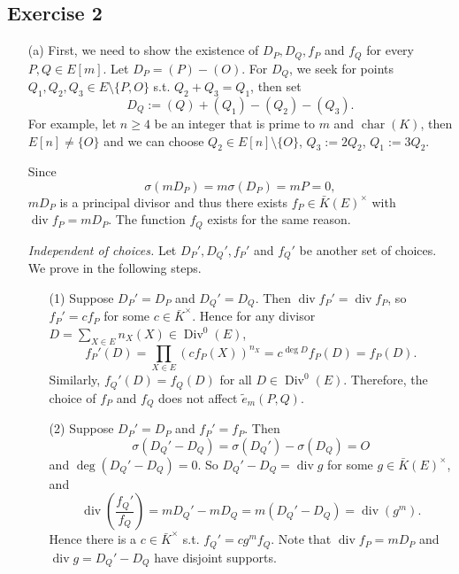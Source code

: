\documentclass{article}
\theoremstyle{definition}
\theoremstyle{remark}
\DeclareMathOperator{\cha}{char} %
\renewcommand{\div}{\mathop{\mathrm{div}}}
\DeclareMathOperator{\Div}{Div}
\begin{document}
\subsection*{Exercise 2}
\begin{enumerate}
\item [(a)]
First, we need to show the existence of $D_P, D_Q, f_P$ and $f_Q$ for every $P, Q\in E[m]$.
Let $D_P = (P) - (O)$.
For $D_Q$, we seek for points $Q_1, Q_2, Q_3\in E\setminus\{P, O\}$ s.t. $Q_2+Q_3 = Q_1$, then set \[D_Q := (Q) + (Q_1) - (Q_2) - (Q_3).\] For example, let $n\ge 4$ be an integer that is prime to $m$ and $\cha(K)$, then $E[n]\ne \{O\}$ and we can choose $Q_2\in E[n]\setminus\{O\}$, $Q_3 := 2Q_2$, $Q_1 := 3Q_2$.

Since \[\sigma(mD_P) = m\sigma(D_P) = mP = 0,\]
$mD_P$ is a principal divisor and thus there exists $f_P\in\bar{K}(E)^\times$ with $\div f_P = mD_P$.
The function $f_Q$ exists for the same reason.

\textit{Independent of choices.}
Let $D_P', D_Q', f_P'$ and $f_Q'$ be another set of choices.
We prove in the following steps.
\begin{enumerate}
    \item [(1)] Suppose $D_P' = D_P$ and $D_Q' = D_Q$. Then $\div f_P' = \div f_P$, so $f_P' = cf_P$ for some $c\in \bar{K}^\times$. Hence for any divisor $D = \sum_{X\in E} n_X(X)\in\Div^0(E)$, \[f_P'(D) = \prod_{X\in E} (cf_P(X))^{n_X} = c^{\deg D}f_P(D) = f_P(D).\]
    Similarly, $f_Q'(D) = f_Q(D)$ for all $D\in\Div^0(E)$. Therefore, the choice of $f_P$ and $f_Q$ does not affect $\tilde{e}_m(P, Q)$.

    \item [(2)] Suppose $D_P' = D_P$ and $f_P' = f_P$. Then \[\sigma(D_Q'-D_Q) = \sigma(D_Q') - \sigma(D_Q) = O\]
    and $\deg(D_Q'-D_Q) = 0$. So $D_Q' - D_Q = \div g$ for some $g\in\bar{K}(E)^\times$, and\[\div\left( \frac{f_Q'}{f_Q} \right) = mD_Q'-mD_Q = m(D_Q'-D_Q) = \div (g^m).\]
    Hence there is a $c\in \bar{K}^\times$ s.t. $f_Q' = cg^mf_Q$.
    Note that $\div f_P = mD_P$ and $\div g = D_Q'-D_Q$ have disjoint supports.


\end{enumerate}
\end{enumerate}
\end{document}
